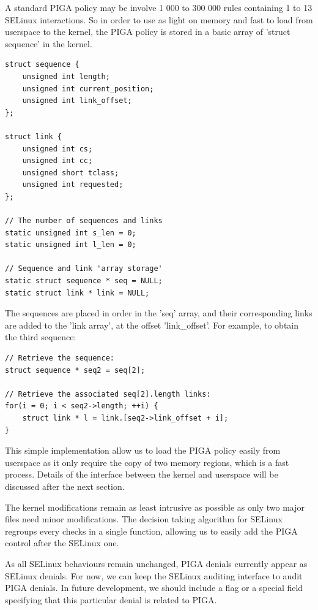 \documentclass[pdftex,a4paper,titlepage,11pt]{article}
\begin{document}
A standard PIGA policy may be involve 1 000 to 300 000 rules containing 1 to 13
SELinux interactions. So in order to use as light on memory and fast to load
from userspace to the kernel, the PIGA policy is stored in a basic array of
'struct sequence' in the kernel.

\begin{lstlisting}
struct sequence {
	unsigned int length;
	unsigned int current_position;
	unsigned int link_offset;
};

struct link {
	unsigned int cs;
	unsigned int cc;
	unsigned short tclass;
	unsigned int requested;
};

// The number of sequences and links
static unsigned int s_len = 0;
static unsigned int l_len = 0;

// Sequence and link 'array storage'
static struct sequence * seq = NULL;
static struct link * link = NULL;
\end{lstlisting}

\smallskip

The sequences are placed in order in the 'seq' array, and their corresponding
links are added to the 'link array', at the offset 'link\_offset'. For example,
to obtain the third sequence:

\begin{lstlisting}
// Retrieve the sequence:
struct sequence * seq2 = seq[2];

// Retrieve the associated seq[2].length links:
for(i = 0; i < seq2->length; ++i) {
	struct link * l = link.[seq2->link_offset + i];
}
\end{lstlisting}

\smallskip

This simple implementation allow us to load the PIGA policy easily from
userspace as it only require the copy of two memory regions, which is a fast
process. Details of the interface between the kernel and userspace will be
discussed after the next section.

\bigskip

The kernel modifications remain as least intrusive as possible as only two major
files need minor modifications. The decision taking algorithm for SELinux
regroups every checks in a single function, allowing us to easily add the PIGA
control after the SELinux one.

\bigskip

As all SELinux behaviours remain unchanged, PIGA denials currently appear as
SELinux denials. For now, we can keep the SELinux auditing interface to audit
PIGA denials. In future development, we should include a flag or a special field
specifying that this particular denial is related to PIGA.
\end{document}
